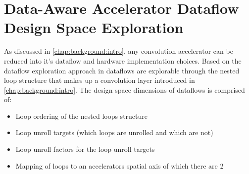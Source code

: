 \chapter{Data-Aware Accelerator Dataflow Design Space Exploration}
\label{chap:dataflow_dse:intro}

As discussed in \autoref{chap:background:intro}, any convolution accelerator can
be reduced into it's dataflow and hardware implementation choices. Based on the
dataflow exploration approach in \cite{dnn_df_overrated_v1} dataflows are
explorable through the nested loop structure that makes up a convolution
layer introduced in \autoref{chap:background:intro}.
The design space dimensions of dataflows is comprised of:
\begin{itemize}
    \item Loop ordering of the nested loops structure
    \item Loop unroll targets (which loops are unrolled and which are not) 
    \item Loop unroll factors for the loop unroll targets
    \item Mapping of loops to an accelerators spatial axis of which there are 2
\end{itemize}

